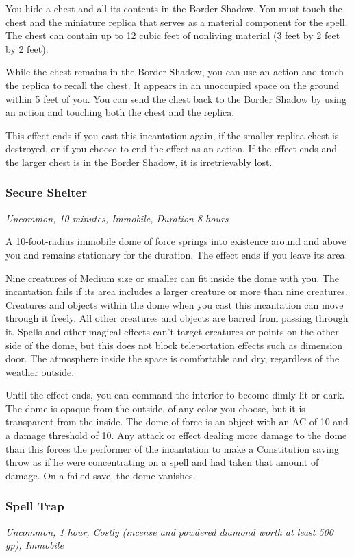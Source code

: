 You hide a chest and all its contents in the Border Shadow. You must touch the chest and the miniature replica that serves as a material component for the spell. The chest can contain up to 12 cubic feet of nonliving material (3 feet by 2 feet by 2 feet).

While the chest remains in the Border Shadow, you can use an action and touch the replica to recall the chest. It appears in an unoccupied space on the ground within 5 feet of you. You can send the chest back to the Border Shadow by using an action and touching both the chest and the replica.

This effect ends if you cast this incantation again, if the smaller replica chest is destroyed, or if you choose to end the effect as an action. If the effect ends and the larger chest is in the Border Shadow, it is irretrievably lost.

\subsubsection{Secure Shelter}
\textit{Uncommon, 10 minutes, Immobile, Duration 8 hours}

A 10-foot-radius immobile dome of force springs into existence around and above you and remains stationary for the duration. The effect ends if you leave its area.

Nine creatures of Medium size or smaller can fit inside the dome with you. The incantation fails if its area includes a larger creature or more than nine creatures. Creatures and objects within the dome when you cast this incantation can move through it freely. All other creatures and objects are barred from passing through it. Spells and other magical effects can't target creatures or points on the other side of the dome, but this does not block teleportation effects such as dimension door. The atmosphere inside the space is comfortable and dry, regardless of the weather outside.

Until the effect ends, you can command the interior to become dimly lit or dark. The dome is opaque from the outside, of any color you choose, but it is transparent from the inside.
The dome of force is an object with an AC of 10 and a damage threshold of 10. Any attack or effect dealing more damage to the dome than this forces the performer of the incantation to make a Constitution saving throw as if he were concentrating on a spell and had taken that amount of damage. On a failed save, the dome vanishes.

\subsubsection{Spell Trap}
\textit{Uncommon, 1 hour, Costly (incense and powdered diamond worth at least 500 gp), Immobile}

